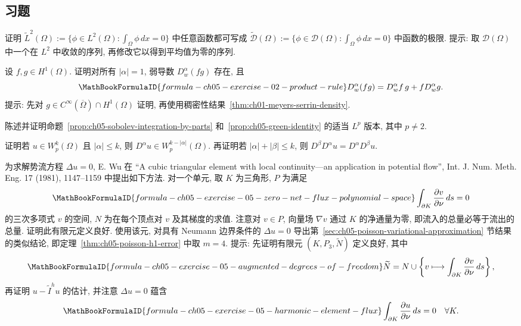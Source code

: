 \subsection*{习题}
\label{sec:ch05-exercises}
\setcounter{exerciseitem}{0}

\begin{MBExercise}
\label{exr:ch05-01}
证明 $\widetilde L^2(\Omega):=\{\phi\in L^2(\Omega):\int_\Omega\phi\,dx=0\}$ 中任意函数都可写成 $\widetilde{\mathcal D}(\Omega):=\{\phi\in\mathcal D(\Omega):\int_\Omega\phi\,dx=0\}$ 中函数的极限. 提示: 取 $\mathcal D(\Omega)$ 中一个在 $L^2$ 中收敛的序列, 再修改它以得到平均值为零的序列.
\end{MBExercise}

\begin{MBExercise}
\label{exr:ch05-02}
设 $f,g\in H^1(\Omega)$. 证明对所有 $|\alpha|=1$, 弱导数 $D_w^\alpha(fg)$ 存在, 且
\[
\MathBookFormulaID{formula-ch05-exercise-02-product-rule}
D_w^\alpha(fg)=D_w^\alpha f\,g+fD_w^\alpha g.
\]
提示: 先对 $g\in C^\infty(\overline\Omega)\cap H^1(\Omega)$ 证明, 再使用稠密性结果~\ref{thm:ch01-meyers-serrin-density}.
\end{MBExercise}

\begin{MBExercise}
\label{exr:ch05-03}
陈述并证明命题~\ref{prop:ch05-sobolev-integration-by-parts} 和~\ref{prop:ch05-green-identity} 的适当 $L^p$ 版本, 其中 $p\ne2$.
\end{MBExercise}

\begin{MBExercise}
\label{exr:ch05-04}
证明若 $u\in W_p^k(\Omega)$ 且 $|\alpha|\leq k$, 则 $D^\alpha u\in W_p^{k-|\alpha|}(\Omega)$. 再证明若 $|\alpha|+|\beta|\leq k$, 则 $D^\beta D^\alpha u=D^\alpha D^\beta u$.
\end{MBExercise}

\begin{MBExercise}
\label{exr:ch05-05}
为求解势流方程 $\Delta u=0$, E. Wu 在 ``A cubic triangular element with local continuity---an application in potential flow'', Int. J. Num. Meth. Eng. 17 (1981), 1147--1159 中提出如下方法. 对一个单元, 取 $K$ 为三角形, $P$ 为满足
\[
\MathBookFormulaID{formula-ch05-exercise-05-zero-net-flux-polynomial-space}
\int_{\partial K}\frac{\partial v}{\partial\nu}\,ds=0
\]
的三次多项式 $v$ 的空间, $N$ 为在每个顶点对 $v$ 及其梯度的求值. 注意对 $v\in P$, 向量场 $\nabla v$ 通过 $K$ 的净通量为零, 即流入的总量必等于流出的总量. 证明此有限元定义良好. 使用该元, 对具有 Neumann 边界条件的 $\Delta u=0$ 导出第~\ref{sec:ch05-poisson-variational-approximation} 节结果的类似结论, 即定理~\ref{thm:ch05-poisson-h1-error} 中取 $m=4$. 提示: 先证明有限元 $(K,P_3,\widetilde N)$ 定义良好, 其中
\[
\MathBookFormulaID{formula-ch05-exercise-05-augmented-degrees-of-freedom}
\widetilde N=N\cup\left\{v\longmapsto
\int_{\partial K}\frac{\partial v}{\partial\nu}\,ds\right\},
\]
再证明 $u-\widetilde I^h u$ 的估计, 并注意 $\Delta u=0$ 蕴含
\[
\MathBookFormulaID{formula-ch05-exercise-05-harmonic-element-flux}
\int_{\partial K}\frac{\partial u}{\partial\nu}\,ds=0
\quad\forall K.
\]
\end{MBExercise}

